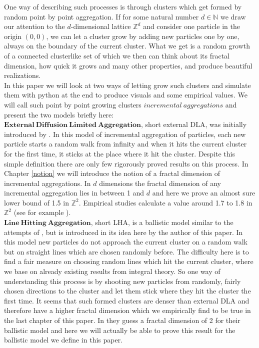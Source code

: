 \documentclass[12pt,a4paper]{scrartcl}
\newcommand{\Z}{\mathbb{Z}} %
\newcommand{\N}{\mathbb{N}} %
\newcommand{\1}{\mathbbm{1}}
\theoremstyle{definition}
\numberwithin{equation}{section}
\begin{document}
	\noindent One way of describing such processes is through clusters which get formed by random point by point aggregation. If for some natural number $d\in\N$ we draw our attention to the $d$-dimensional lattice $\Z^d$ and consider one particle in the origin $(0,0)$, we can let a cluster grow by adding new particles one by one, always on the boundary of the current cluster. What we get is a random growth of a connected clusterlike set of which we then can think about its fractal dimension, how quick it grows and many other properties, and produce beautiful realizations. \\
	
	\noindent In this paper we will look at two ways of letting grow such clusters and simulate them with python at the end to produce visuals and some empirical values. We will call such point by point growing clusters $\mathit{incremental\ aggregations}$ and present the two models briefly here:\\

	\noindent $\mathbf{External\ Diffusion\ Limited\ Aggregation}$, short external DLA, was initially introduced by \cite[Witten and Sander, 1983]{wittensander}. In this model of incremental aggregation of particles, each new particle starts a random walk from infinity and when it hits the current cluster for the first time, it sticks at the place where it hit the cluster. Despite this simple definition there are only few rigorously proved results on this process. In Chapter \ref{notion} we will introduce the notion of a fractal dimension of incremental aggregations. In $d$ dimensions the fractal dimension of any incremental aggregation lies in between 1 and $d$ and here we prove an almost sure lower bound of 1.5 in $\Z^2$. Empirical studies calculate a value around 1.7 to 1.8 in $\Z^2$ (see for example \cite{magnetic}).  \\
	
	\noindent $\mathbf{Line\ Hitting\ Aggregation}$, short LHA, is a ballistic model similar to the attempts of \cite{ballistic}, but is introduced in its idea here by the author of this paper. In this model new particles do not approach the current cluster on a random walk but on straight lines which are chosen randomly before. The difficulty here is to find a fair measure on choosing random lines which hit the current cluster, where we base on already existing results from integral theory. So one way of understanding this process is by shooting new particles from randomly, fairly chosen directions to the cluster and let them stick where they hit the cluster the first time. It seems that such formed clusters are denser than external DLA and therefore have a higher fractal dimension which we empirically find to be true in the last chapter of this paper. In \cite{ballistic} they guess a fractal dimension of 2 for their ballistic model and here we will actually be able to prove this result for the ballistic model we define in this paper. \\
	
\end{document}
